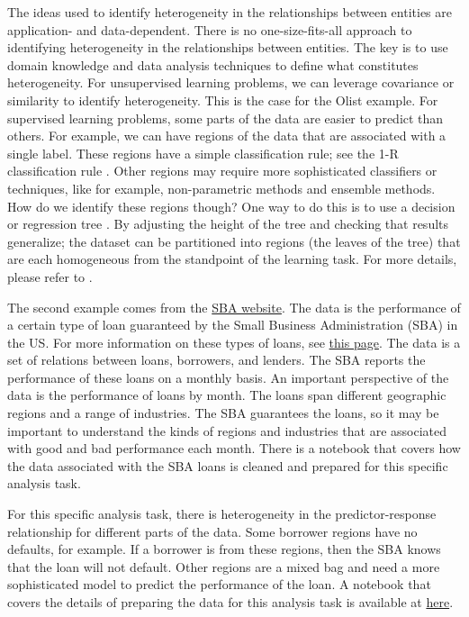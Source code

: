 \documentclass{article}
\begin{document}
The ideas used to identify heterogeneity in the relationships between entities are application- and data-dependent. There is no one-size-fits-all approach to identifying heterogeneity in the relationships between entities. The key is to use domain knowledge and data analysis techniques to define what constitutes heterogeneity. For unsupervised learning problems, we can leverage covariance or similarity to identify heterogeneity. This is the case for the Olist example. For supervised learning problems, some parts of the data are easier to predict than others. For example, we can have regions of the data that are associated with a single label. These regions have a simple classification rule; see the 1-R classification rule \cite{holte1993very}. Other regions may require more sophisticated classifiers or techniques, like for example, non-parametric methods and ensemble methods. How do we identify these regions though? One way to do this is to use a decision or regression tree \cite{breiman2017classification}. By adjusting the height of the tree and checking that results generalize; the dataset can be partitioned into regions (the leaves of the tree) that are each homogeneous from the standpoint of the learning task. For more details, please refer to \cite{sambasivan_das_augmented_trees_2019}.

The second example comes from the \href{https://data.sba.gov/dataset/7-a-504-foia}{SBA website}. The data is the performance of a certain type of loan guaranteed by the Small Business Administration (SBA) in the US. For more information on these types of loans, see \href{https://www.sba.gov/funding-programs/loans/7a-loans}{this page}. The data is a set of relations between loans, borrowers, and lenders. The SBA reports the performance of these loans on a monthly basis. An important perspective of the data is the performance of loans by month. The loans span different geographic regions and a range of industries. The SBA guarantees the loans, so it may be important to understand the kinds of regions and industries that are associated with good and bad performance each month. There is a notebook that covers how the data associated with the SBA loans is cleaned and prepared for this specific analysis task.

For this specific analysis task, there is heterogeneity in the predictor-response relationship for different parts of the data. Some borrower regions have no defaults, for example. If a borrower is from these regions, then the SBA knows that the loan will not default. Other regions are a mixed bag and need a more sophisticated model to predict the performance of the loan. A notebook that covers the details of preparing the data for this analysis task is available at \href{https://github.com/rajivsam/descriptive_analytics/blob/main/notebooks/sba_loans.ipynb}{here}.
\end{document}
